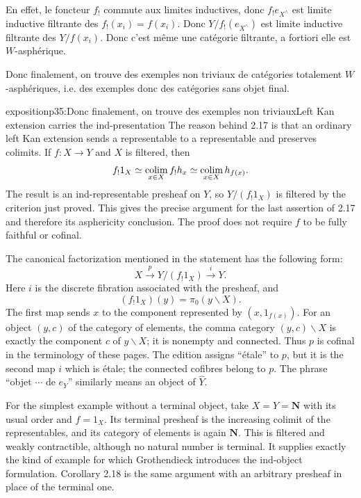 En effet, le foncteur $f_!$ commute aux limites inductives, donc $f_! e_{X^\wedge}$ est limite inductive filtrante des $f_!(x_i) = f(x_i)$. Donc $Y/f_!(e_{X^\wedge})$ est limite inductive filtrante des $Y/f(x_i)$. Donc c'est même une catégorie filtrante, a fortiori elle est $W$-asphérique.

Donc finalement, on trouve des exemples non triviaux de catégories totalement $W$-asphériques, i.e. des exemples donc des catégories sans objet final. %

\begin{dcomment}{exposition}{p35:Donc finalement, on trouve des exemples non triviaux}{Left Kan extension carries the ind-presentation}
The reason behind 2.17 is that an ordinary left Kan extension sends a representable to a representable and preserves colimits. If $f:X\to Y$ and $X$ is filtered, then
\[
 f_!1_X\simeq\mathop{\rm colim}_{x\in X}f_!h_x
          \simeq\mathop{\rm colim}_{x\in X}h_{f(x)}.
\]
The result is an ind-representable presheaf on $Y$, so $Y/(f_!1_X)$ is filtered by the criterion just proved. This gives the precise argument for the last assertion of 2.17 and therefore its asphericity conclusion. The proof does not require $f$ to be fully faithful or cofinal.

The canonical factorization mentioned in the statement has the following form:
\[
 X\xrightarrow{p}Y/(f_!1_X)\xrightarrow{i}Y.
\]
Here $i$ is the discrete fibration associated with the presheaf, and
\[
 (f_!1_X)(y)=\pi _0(y\backslash X).
\]
The first map sends $x$ to the component represented by $(x,1_{f(x)})$. For an object $(y,c)$ of the category of elements, the comma category $(y,c)\backslash X$ is exactly the component $c$ of $y\backslash X$; it is nonempty and connected. Thus $p$ is cofinal in the terminology of these pages. The edition assigns ``\'etale'' to $p$, but it is the second map $i$ which is \'etale; the connected cofibres belong to $p$. The phrase ``objet $\cdots$ de $e_Y$'' similarly means an object of $\widehat Y$.

For the simplest example without a terminal object, take $X=Y=\mathbf N$ with its usual order and $f=1_X$. Its terminal presheaf is the increasing colimit of the representables, and its category of elements is again $\mathbf N$. This is filtered and weakly contractible, although no natural number is terminal. It supplies exactly the kind of example for which Grothendieck introduces the ind-object formulation. Corollary 2.18 is the same argument with an arbitrary presheaf in place of the terminal one.
\end{dcomment}


